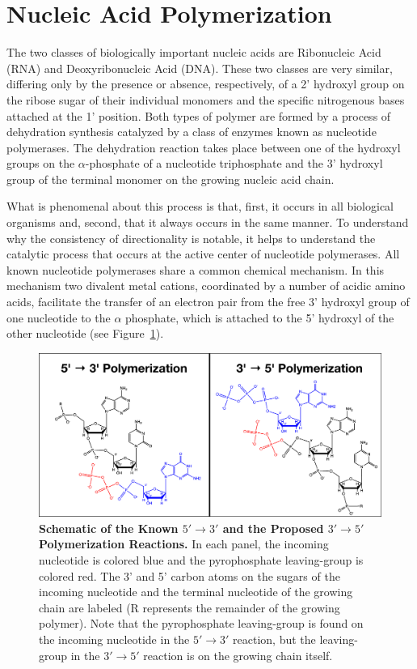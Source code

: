 \section*{Nucleic Acid Polymerization} %
\label{sec:nucleotide_polymerization}
The two classes of biologically important nucleic acids are Ribonucleic Acid (RNA) and Deoxyribonucleic Acid (DNA). These two classes are very similar, differing only by the presence or absence, respectively, of a 2' hydroxyl group on the ribose sugar of their individual monomers and the specific nitrogenous bases attached at the 1' position. Both types of polymer are formed by a process of dehydration synthesis catalyzed by a class of enzymes known as nucleotide polymerases. The dehydration reaction takes place between one of the hydroxyl groups on the $\alpha$-phosphate of a nucleotide triphosphate and the 3' hydroxyl group of the terminal monomer on the growing nucleic acid chain\cite{ZannisHadjopoulos:1999p1929}.

What is phenomenal about this process is that, first, it occurs in all biological organisms and, second, that it always occurs in the same manner. To understand why the consistency of directionality is notable, it helps to understand the catalytic process that occurs at the active center of nucleotide polymerases. All known nucleotide polymerases share a common chemical mechanism. In this mechanism two divalent metal cations, coordinated by a number of acidic amino acids, facilitate the transfer of an electron pair from the free 3' hydroxyl group of one nucleotide to the $\alpha$ phosphate, which is attached to the 5' hydroxyl of the other nucleotide\cite{Castro:2009p953} (see Figure~\ref{fig:reactions}).

\begin{figure}[h]
	\centering
		\includegraphics[width=\textwidth]{reactions}
	\caption{\textbf{Schematic of the Known $5'\to3'$ and the Proposed $3'\to5'$ Polymerization Reactions.} In each panel, the incoming nucleotide is colored blue and the pyrophosphate leaving-group is colored red. The 3' and 5' carbon atoms on the sugars of the incoming nucleotide and the terminal nucleotide of the growing chain are labeled (R represents the remainder of the growing polymer). Note that the pyrophosphate leaving-group is found on the incoming nucleotide in the $5'\to3'$ reaction, but the leaving-group in the $3'\to5'$ reaction is on the growing chain itself.}
	\label{fig:reactions}
\end{figure}


